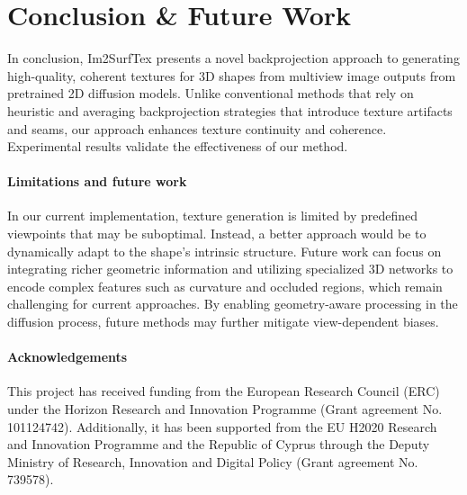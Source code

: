 \section{Conclusion \& Future Work}

In conclusion, Im2SurfTex presents a novel backprojection approach to generating high-quality, coherent textures for 3D shapes from multiview image outputs from pretrained 2D diffusion models. Unlike conventional methods that rely on heuristic and averaging backprojection strategies that introduce texture artifacts and seams, our approach enhances texture continuity and coherence. Experimental results validate the effectiveness of our method. 

\paragraph{Limitations and future work}  In our current implementation, texture generation is limited by predefined viewpoints that may be suboptimal. Instead, a better approach would be to dynamically adapt to the shape’s intrinsic structure.
Future work can focus on integrating richer geometric information and utilizing specialized 3D networks to encode complex features such as curvature and occluded regions,
which remain challenging for current approaches. By enabling geometry-aware processing in the diffusion process, future methods may further mitigate view-dependent biases.

\paragraph{Acknowledgements} This project has received funding from the European Research Council (ERC) under the Horizon Research and Innovation Programme (Grant agreement No. 101124742). Additionally, it has been supported from the EU H2020 Research and Innovation Programme and the Republic of Cyprus through the Deputy Ministry of Research, Innovation and Digital Policy (Grant agreement No. 739578).